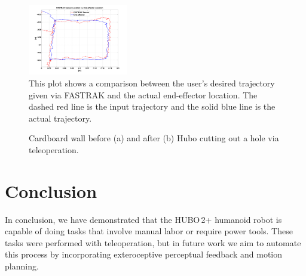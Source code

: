 \documentclass[letterpaper, 10 pt, conference]{IEEEtran}
\begin{document}
\begin{figure}[h]
  \centering
  \includegraphics[width=0.39\textwidth]{figures/FASTRAKvsEndEffector}
  \caption{This plot shows a comparison between the user's desired trajectory given via FASTRAK and the actual end-effector location. The dashed red line is the input trajectory and the solid blue line is the actual trajectory.}
  \label{fig:fastTrakVsEE}
\end{figure}

\begin{figure}[t]
  \center
  \caption{\small Cardboard wall before (a) and after (b) Hubo cutting out a hole via teleoperation.}
  \label{fig:cardboardHole}
\end{figure}

\section{Conclusion} \label{sec:conclusionAndFutureWork}
In conclusion, we have demonstrated that the HUBO\,2+ humanoid robot is capable of doing tasks that involve manual labor or require power tools. These tasks were performed with teleoperation, but in future work we aim to automate this process by incorporating exteroceptive perceptual feedback and motion planning.
\end{document}
